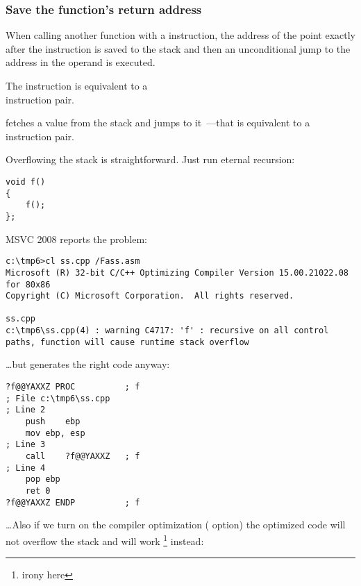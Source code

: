 \subsubsection{Save the function's return address}


When calling another function with a \CALL instruction, the address of the point exactly after the \CALL instruction is saved 
to the stack and then an unconditional jump to the address in the \CALL operand is executed.

The \CALL instruction is equivalent to a\\
 instruction pair.

\RET fetches a value from the stack and jumps to it~---that is equivalent to a  instruction pair.

\myindex{\Recursion}
Overflowing the stack is straightforward. Just run eternal recursion:

\begin{lstlisting}[style=customc]
void f()
{
	f();
};
\end{lstlisting}

MSVC 2008 reports the problem:

\begin{lstlisting}
c:\tmp6>cl ss.cpp /Fass.asm
Microsoft (R) 32-bit C/C++ Optimizing Compiler Version 15.00.21022.08 for 80x86
Copyright (C) Microsoft Corporation.  All rights reserved.

ss.cpp
c:\tmp6\ss.cpp(4) : warning C4717: 'f' : recursive on all control paths, function will cause runtime stack overflow
\end{lstlisting}

\dots but generates the right code anyway:

\begin{lstlisting}[style=customasmx86]
?f@@YAXXZ PROC			; f
; File c:\tmp6\ss.cpp
; Line 2
	push	ebp
	mov	ebp, esp
; Line 3
	call	?f@@YAXXZ	; f
; Line 4
	pop	ebp
	ret	0
?f@@YAXXZ ENDP			; f
\end{lstlisting}

\dots Also if we turn on the compiler optimization (\TT{\Ox} option) the optimized code will not overflow the stack 
and will work \footnote{irony here} instead:

